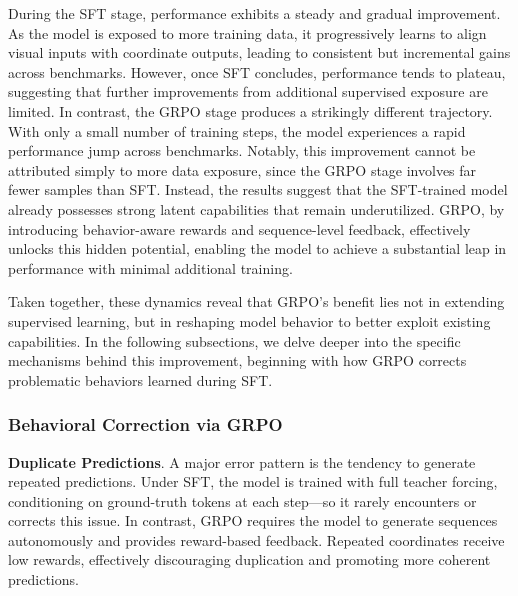 During the SFT stage, performance exhibits a steady and gradual improvement. As the model is exposed to more training data, it progressively learns to align visual inputs with coordinate outputs, leading to consistent but incremental gains across benchmarks. However, once SFT concludes, performance tends to plateau, suggesting that further improvements from additional supervised exposure are limited. In contrast, the GRPO stage produces a strikingly different trajectory. With only a small number of training steps, the model experiences a rapid performance jump across benchmarks. Notably, this improvement cannot be attributed simply to more data exposure, since the GRPO stage involves far fewer samples than SFT. Instead, the results suggest that the SFT-trained model already possesses strong latent capabilities that remain underutilized. GRPO, by introducing behavior-aware rewards and sequence-level feedback, effectively unlocks this hidden potential, enabling the model to achieve a substantial leap in performance with minimal additional training.

Taken together, these dynamics reveal that GRPO’s benefit lies not in extending supervised learning, but in reshaping model behavior to better exploit existing capabilities. In the following subsections, we delve deeper into the specific mechanisms behind this improvement, beginning with how GRPO corrects problematic behaviors learned during SFT.

\subsubsection{Behavioral Correction via GRPO}
\textbf{Duplicate Predictions}. A major error pattern is the tendency to generate repeated predictions. Under SFT, the model is trained with full teacher forcing, conditioning on ground-truth tokens at each step—so it rarely encounters or corrects this issue. In contrast, GRPO requires the model to generate sequences autonomously and provides reward-based feedback. Repeated coordinates receive low rewards, effectively discouraging duplication and promoting more coherent predictions.





